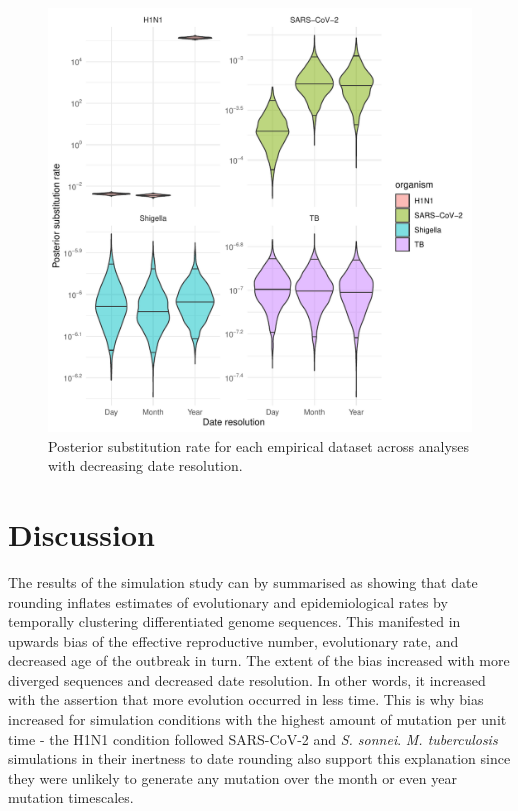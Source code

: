 \documentclass{article}
\begin{document}
\begin{spacing}{1.5}
\begin{figure}[h!]
    \centering
    \includegraphics{empirical_clock_trajectory.pdf}
    \caption{Posterior substitution rate for each empirical dataset across analyses with decreasing date resolution.}
    \label{fig:empClock}
\end{figure}

\section*{Discussion}

The results of the simulation study can by summarised as showing that date rounding inflates estimates of evolutionary and epidemiological rates by temporally clustering differentiated genome sequences. This manifested in upwards bias of the effective reproductive number, evolutionary rate, and decreased age of the outbreak in turn. The extent of the bias increased with more diverged sequences and decreased date resolution. In other words, it increased with the assertion that more evolution occurred in less time. This is why bias increased for simulation conditions with the highest amount of mutation per unit time - the H1N1 condition followed SARS-CoV-2 and \textit{S. sonnei}. \textit{M. tuberculosis} simulations in their inertness to date rounding also support this explanation since they were unlikely to generate any mutation over the month or even year mutation timescales.


\end{spacing}
\end{document}
